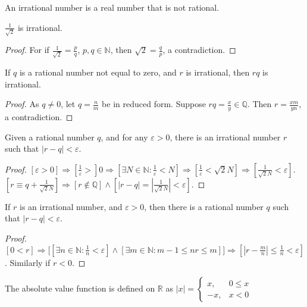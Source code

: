 \documentclass[crop=false,class=book,oneside]{standalone}
\begin{document}
            \begin{definition}
            An irrational number is a real number that is not rational.
            \end{definition}
            \begin{corollary}
            $\frac{1}{\sqrt{2}}$ is irrational. 
            \end{corollary}
            \begin{proof}
            For if $\frac{1}{\sqrt{2}} = \frac{p}{q}$, $p,q\in \mathbb{N}$, then $\sqrt{2} = \frac{q}{p}$, a contradiction.
            \end{proof}
            \begin{lemma}
            If $q$ is a rational number not equal to zero, and $r$ is irrational, then $rq$ is irrational.
            \end{lemma}
            \begin{proof}
            As $q\ne 0$, let $q = \frac{n}{m}$ be in reduced form. Suppose $rq = \frac{x}{y}\in \mathbb{Q}$. Then $r=\frac{xm}{yn}$, a contradiction.
            \end{proof}
            \begin{theorem}
            Given a rational number $q$, and for any $\varepsilon>0$, there is an irrational number $r$ such that $|r-q|<\varepsilon$.
            \end{theorem}
            \begin{proof}
            $[\varepsilon>0]\Rightarrow [\frac{1}{\varepsilon}>]0\Rightarrow [\exists N\in \mathbb{N}:\frac{1}{\varepsilon}<N]\Rightarrow [\frac{1}{\varepsilon} < \sqrt{2}N]\Rightarrow [\frac{1}{\sqrt{2}N}< \varepsilon]$. $[r \equiv q+\frac{1}{\sqrt{2}{N}}]\Rightarrow [r\notin \mathbb{Q}]\land [|r-q| = |\frac{1}{\sqrt{2}N}| < \varepsilon]$.
            \end{proof}
            \begin{theorem}
            If $r$ is an irrational number, and $\varepsilon>0$, then there is a rational number $q$ such that $|r-q|<\varepsilon$.
            \end{theorem}
            \begin{proof}
            $[0<r]\Rightarrow \big[[\exists n\in \mathbb{N}: \frac{1}{n} < \varepsilon]\land[\exists m\in \mathbb{N}: m-1\leq nr \leq m]\big]\Rightarrow[|r-\frac{m}{n}| \leq \frac{1}{n} < \varepsilon]$. Similarly if $r<0$.
            \end{proof}
            \begin{definition}
            The absolute value function is defined on $\mathbb{R}$ as $|x| = \begin{cases} x, & 0 \leq x \\ -x, & x<0 \end{cases}$
            \end{definition}
\end{document}
